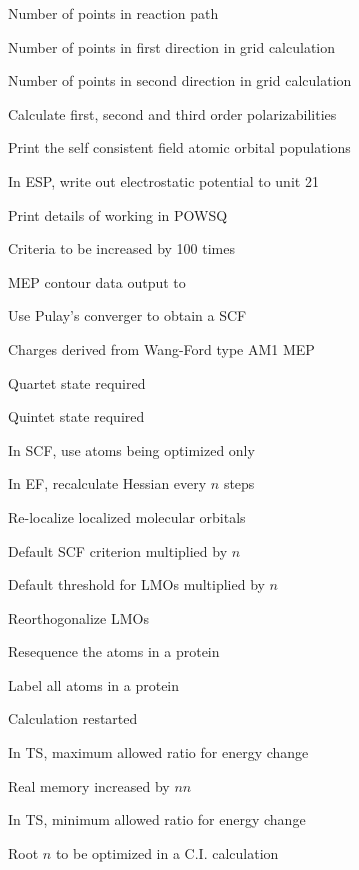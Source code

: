 \begin{description}
\item[] Number of points in reaction path
\item[] Number of points in first direction in grid calculation
\item[] Number of points in second direction in grid calculation
\item[] Calculate first, second and third order polarizabilities
\item[] Print the self consistent field atomic orbital populations
\item[] In ESP, write out electrostatic potential to unit 21
\item[] Print details of working in POWSQ
\item[] Criteria to be increased by 100 times
\item[] MEP contour data output to 
\item[] Use Pulay's converger to obtain a SCF
\item[] Charges derived from Wang-Ford type AM1 MEP
\item[] Quartet state required
\item[] Quintet state required
\item[] In SCF, use atoms being optimized only
\item[] In EF, recalculate Hessian every $n$ steps
\item[] Re-localize localized molecular orbitals
\item[] Default SCF criterion multiplied by $n$
\item[] Default threshold for LMOs multiplied by $n$
\item[] Reorthogonalize LMOs
\item[] Resequence the atoms in a protein
\item[] Label all atoms in a protein
\item[] Calculation restarted
\item[] In TS, maximum allowed ratio for energy change
\item[] Real memory increased by $nn$
\item[] In TS, minimum allowed ratio for energy change
\item[] Root $n$ to be optimized in a C.I. calculation

\end{description}
